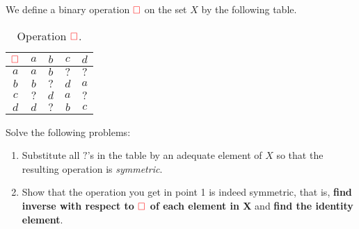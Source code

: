 \documentclass[a4paper,11pt]{article}
\newcommand{\clr}{\textcolor{red}}
\begin{document}
We define a binary operation $\clr{\square}$ on the set $X$ by the following
table.

\begin{table}[ht]
 \centering
 \begin{tabular}{c|cccc}
  $\clr{\square}$ & $a$ & $b$ & $c$ & $d$ \\
  \midrule
  $a$ & $a$ & $b$ & $?$ & $?$ \\
  $b$ & $b$ & $?$ & $d$ & $a$ \\
  $c$ & $?$ & $d$ & $a$ & $?$ \\
  $d$ & $d$ & $?$ & $b$ & $c$
 \end{tabular}
 \caption*{Operation $\clr{\square}$.}
\end{table}

Solve the following problems:
\begin{enumerate}
 \item Substitute all $?$'s in the table by an adequate element of $X$ so that
  the resulting operation is \emph{symmetric}.
 \item Show that the operation you get in point 1 is indeed symmetric, that is,
  \textbf{find inverse with respect to $\clr{\square}$ of each element in X} and
  \textbf{find the identity element}.
\end{enumerate}
\end{document}
